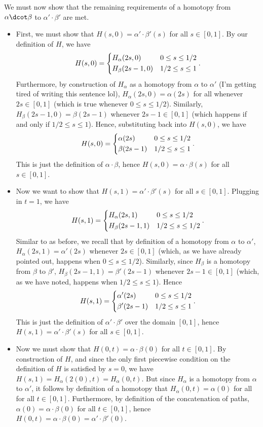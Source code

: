 \documentclass{article}
\begin{document}
We must now show that the remaining requirements of a homotopy from $\alpha\dcot\beta$ to $\alpha'\cdot\beta'$ are met.
\begin{itemize}
    \item First, we must show that $H(s,0) = \alpha'\cdot\beta'(s)$ for all $s\in [0,1]$. By our definition of $H$, we have 
    $$H(s,0) = \begin{dcases}
    H_\alpha(2s,0) & 0\le s \le 1/2\\
    H_\beta(2s-1,0) & 1/2 \le s \le 1
    \end{dcases}.$$
    Furthermore, by construction of $H_\alpha$ as a homotopy from $\alpha$ to $\alpha'$ (I'm getting tired of writing this sentence lol), $H_\alpha(2s, 0) = \alpha(2s)$ for all whenever $2s \in [0,1]$ (which is true whenever $0\le s\le 1/2$). Similarly, $H_\beta(2s-1,0) = \beta(2s-1)$ whenever $2s-1\in [0,1]$ (which happens if and only if $1/2\le s\le 1$). Hence, substituting back into $H(s,0)$, we have 
    $$H(s,0) = 
    \begin{dcases}
    \alpha(2s) & 0\le s\le 1/2\\
    \beta(2s-1) & 1/2\le s \le 1
    \end{dcases}.$$
    This is just the definition of $\alpha\cdot\beta$, hence
    $H(s,0) = \alpha\cdot\beta(s)$ for all $s\in [0,1]$.
    \item Now we want to show that $H(s,1) = \alpha'\cdot\beta'(s)$ for all $s\in[0,1]$. Plugging in $t = 1$, we have $$
    H(s,1) = \begin{dcases}
    H_\alpha(2s,1) & 0 \le s \le 1/2\\
    H_\beta(2s - 1, 1) & 1/2\le s \le 1/2
    \end{dcases}.
    $$
    Similar to as before, we recall that by definition of a homotopy from $\alpha$ to $\alpha'$, $H_\alpha(2s, 1) = \alpha'(2s)$ whenever $2s \in [0,1]$ (which, as we have already pointed out, happens when $0\le s \le 1/2$). Similarly, since $H_\beta$ is a homotopy from $\beta$ to $\beta'$, $H_\beta(2s-1,1) = \beta'(2s-1)$ whenever $2s-1\in[0,1]$ (which, as we have noted, happens when $1/2\le s \le 1$). Hence $$H(s,1)
    = \begin{dcases}
    \alpha'(2s) & 0\le s \le 1/2\\
    \beta'(2s-1) & 1/2 \le s \le 1
    \end{dcases}.$$
    This is just the definition of $\alpha'\cdot\beta'$ over the domain $[0,1]$, hence $H(s,1) = \alpha'\cdot\beta'(s)$ for all $s\in [0,1]$.
    \item Now we must show that $H(0,t) = \alpha\cdot \beta(0)$ for all $t\in [0,1]$. By construction of $H$, and since the only first piecewise condition on the definition of $H$ is satisfied by $s = 0$, we have $H(s,1) = H_\alpha(2(0), t) = H_\alpha(0,t)$. But since $H_\alpha$ is a homotopy from $\alpha$ to $\alpha'$, it follows by definition of a homotopy that $H_\alpha(0,t) = \alpha(0)$ for all for all $t\in [0,1]$. Furthermore, by definition of the concatenation of paths, $\alpha(0) = \alpha\cdot\beta(0)$ for all $t\in[0,1]$, hence $H(0,t) = \alpha\cdot\beta(0) = \alpha'\cdot\beta'(0)$.

\end{itemize}
\end{document}
